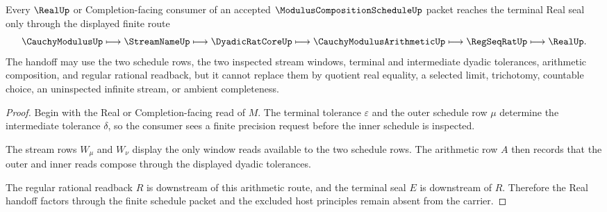 \begin{theorem}
\label{thm:modulus-composition-schedule-real-handoff}
Every $\RealUp$ or Completion-facing consumer of an accepted $\ModulusCompositionScheduleUp$ packet reaches the terminal Real seal only through the displayed finite route
$$
\CauchyModulusUp
\longmapsto
\StreamNameUp
\longmapsto
\DyadicRatCoreUp
\longmapsto
\CauchyModulusArithmeticUp
\longmapsto
\RegSeqRatUp
\longmapsto
\RealUp .
$$
The handoff may use the two schedule rows, the two inspected stream windows, terminal and intermediate dyadic tolerances, arithmetic composition, and regular rational readback, but it cannot replace them by quotient real equality, a selected limit, trichotomy, countable choice, an uninspected infinite stream, or ambient completeness.
\end{theorem}
\begin{proof}
Begin with the Real or Completion-facing read of $M$. The terminal tolerance $\varepsilon$ and the outer schedule row $\mu$ determine the intermediate tolerance $\delta$, so the consumer sees a finite precision request before the inner schedule is inspected.

The stream rows $W_{\mu}$ and $W_{\nu}$ display the only window reads available to the two schedule rows. The arithmetic row $A$ then records that the outer and inner reads compose through the displayed dyadic tolerances.

The regular rational readback $R$ is downstream of this arithmetic route, and the terminal seal $E$ is downstream of $R$. Therefore the Real handoff factors through the finite schedule packet and the excluded host principles remain absent from the carrier.
\end{proof}


